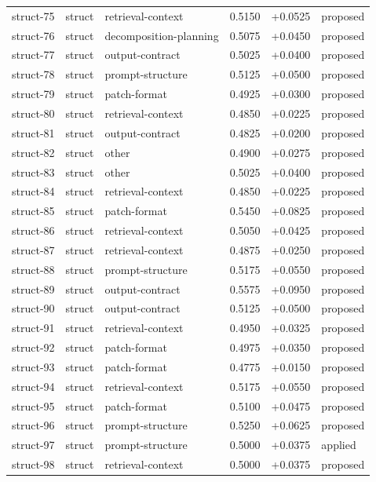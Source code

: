 \begin{center}
\begin{longtable}{llp{5.2cm}rrl}
struct-75 & struct & retrieval-context & 0.5150 & +0.0525 & proposed \\
struct-76 & struct & decomposition-planning & 0.5075 & +0.0450 & proposed \\
struct-77 & struct & output-contract & 0.5025 & +0.0400 & proposed \\
struct-78 & struct & prompt-structure & 0.5125 & +0.0500 & proposed \\
struct-79 & struct & patch-format & 0.4925 & +0.0300 & proposed \\
struct-80 & struct & retrieval-context & 0.4850 & +0.0225 & proposed \\
struct-81 & struct & output-contract & 0.4825 & +0.0200 & proposed \\
struct-82 & struct & other & 0.4900 & +0.0275 & proposed \\
struct-83 & struct & other & 0.5025 & +0.0400 & proposed \\
struct-84 & struct & retrieval-context & 0.4850 & +0.0225 & proposed \\
struct-85 & struct & patch-format & 0.5450 & +0.0825 & proposed \\
struct-86 & struct & retrieval-context & 0.5050 & +0.0425 & proposed \\
struct-87 & struct & retrieval-context & 0.4875 & +0.0250 & proposed \\
struct-88 & struct & prompt-structure & 0.5175 & +0.0550 & proposed \\
struct-89 & struct & output-contract & 0.5575 & +0.0950 & proposed \\
struct-90 & struct & output-contract & 0.5125 & +0.0500 & proposed \\
struct-91 & struct & retrieval-context & 0.4950 & +0.0325 & proposed \\
struct-92 & struct & patch-format & 0.4975 & +0.0350 & proposed \\
struct-93 & struct & patch-format & 0.4775 & +0.0150 & proposed \\
struct-94 & struct & retrieval-context & 0.5175 & +0.0550 & proposed \\
struct-95 & struct & patch-format & 0.5100 & +0.0475 & proposed \\
struct-96 & struct & prompt-structure & 0.5250 & +0.0625 & proposed \\
struct-97 & struct & prompt-structure & 0.5000 & +0.0375 & applied \\
struct-98 & struct & retrieval-context & 0.5000 & +0.0375 & proposed \\

\end{longtable}
\end{center}
